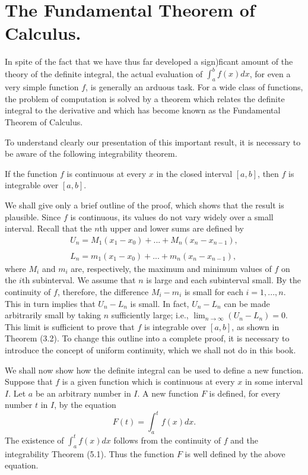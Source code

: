 \section{The Fundamental Theorem of Calculus.} 
In spite of the fact that we have thus far developed a
sign)ficant amount of the theory of the definite integral, the actual evaluation of $ \int_{a}^{b} f(x) dx$, for even a very simple function $f$, is generally an arduous task. For a wide class of functions, the problem of computation is solved by a theorem which relates the definite integral to the derivative and which has become known as the Fundamental Theorem of Calculus.

To understand clearly our presentation of this important result, it is necessary to be aware of the following integrability theorem.

\begin{theorem} %
If the function $f$ is continuous at every $x$ in the closed interval $[a, b]$, then $f$ is integrable over $[a, b]$.
\end{theorem}

We shall give only a brief outline of the proof, which shows that the result is plausible. Since $f$ is continuous, its values do not vary widely over a small interval. Recall that the $n$th upper and lower sums are defined by
$$
\begin{array}{l}
U_n = M_{1}(x_{1} - x_0) + ... + M_{n}(x_{n} - x_{n-1}), \\
\\
L_n = m_{1}(x_{1} - x_0) + ... + m_{n}(x_{n} -  x_{n-1}),
\end{array}
$$
\noindent where $M_i$ and $m_i$ are, respectively, the maximum and minimum values of $f$ on the $i$th subinterval. We assume that $n$ is large and each subinterval small. By the continuity of $f$, therefore, the difference $M_{i} - m_{i}$ is small for each $i = 1, . . ., n$. This in turn implies that
$U_{n} - L_{n}$ is small. In fact, $U_{n} - L_{n}$ can be made arbitrarily small by taking $n$ sufficiently large; i.e., $\lim_{n \rightarrow \infty} (U_{n} - L_{n}) = 0$. This limit is sufficient to prove that $f$ is integrable over $[a, b]$, as shown in Theorem (3.2). To change this outline into a complete proof, it is necessary to introduce the concept of uniform continuity, which we shall not do in this book.

We shall now show how the definite integral can be used to define a new function. Suppose that $f$ is a given function which is continuous at every $x$ in some interval $I$. Let $a$ be an arbitrary number in $I$. A new function $F$ is defined, for every number $t$ in $I$, by the equation
$$
F(t) = \int_{a}^{t} f(x) dx. 
$$
\noindent The existence of $\int_{a}^{t} f(x) dx$ follows from the continuity of $f$ and the integrability Theorem (5.1).  Thus the function $F$ is well defined by the above equation.

